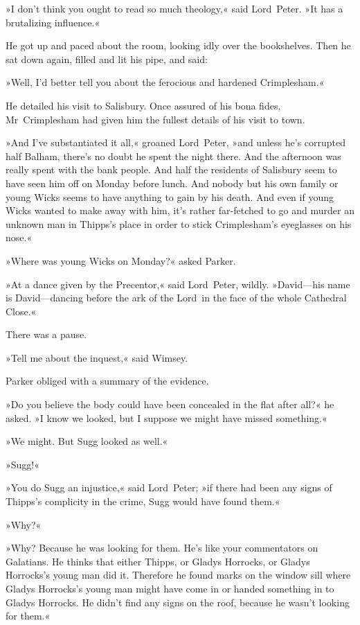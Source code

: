 »I don't think you ought to read so much theology,« said Lord~Peter. »It has a brutalizing influence.«

He got up and paced about the room, looking idly over the bookshelves. Then he sat down again, filled and lit his pipe, and said:

»Well, I'd better tell you about the ferocious and hardened Crimplesham.«

He detailed his visit to Salisbury. Once assured of his bona fides, Mr~Crimplesham had given him the fullest details of his visit to town.

»And I've substantiated it all,« groaned Lord~Peter, »and unless he's corrupted half Balham, there's no doubt he spent the night there. And the afternoon was really spent with the bank people. And half the residents of Salisbury seem to have seen him off on Monday before lunch. And nobody but his own family or young Wicks seems to have anything to gain by his death. And even if young Wicks wanted to make away with him, it's rather far-fetched to go and murder an unknown man in Thipps's place in order to stick Crimplesham's eyeglasses on his nose.«

»Where was young Wicks on Monday?« asked Parker.

»At a dance given by the Precentor,« said Lord~Peter, wildly. »David—his name is David—dancing before the ark of the Lord~in the face of the whole Cathedral Close.«

There was a pause.

»Tell me about the inquest,« said Wimsey.

Parker obliged with a summary of the evidence.

»Do you believe the body could have been concealed in the flat after all?« he asked. »I know we looked, but I suppose we might have missed something.«

»We might. But Sugg looked as well.«

»Sugg!«

»You do Sugg an injustice,« said Lord~Peter; »if there had been any signs of Thipps's complicity in the crime, Sugg would have found them.«

»Why?«

»Why? Because he was looking for them. He's like your commentators on Galatians. He thinks that either Thipps, or Gladys Horrocks, or Gladys Horrocks's young man did it. Therefore he found marks on the window sill where Gladys Horrocks's young man might have come in or handed something in to Gladys Horrocks. He didn't find any signs on the roof, because he wasn't looking for them.«

